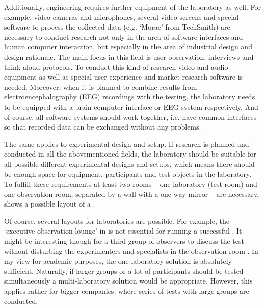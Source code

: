 \documentclass[output=paper]{langsci/langscibook}
\begin{document}
Additionally,  engineering requires further equipment of the laboratory as well. For example, video cameras and microphones, several video screens and special  software to process the collected data (e.g. `Morae' from TechSmith) are necessary to conduct research not only in the area of software interfaces and human computer interaction, but especially in the area of industrial design and design rationale. The main focus in this field is user observation, interviews and think aloud protocols. To conduct this kind of research video and audio equipment as well as special user experience and market research software is needed. Moreover, when it is planned to combine results from electroencephalography (EEG) recordings with the  testing, the laboratory needs to be equipped with a brain computer interface or EEG system respectively. And of course, all software systems should work together, i.e. have common interfaces so that recorded data can be exchanged without any problems.



The same applies to experimental design and setup. If research is planned and conducted in all the abovementioned fields, the laboratory should be suitable for all possible different experimental designs and setups, which means there should be enough space for equipment, participants and test objects in the laboratory. To fulfill these requirements at least two rooms -- one laboratory (test room) and one observation room, separated by a wall with a one way mirror -- are necessary.  shows a possible layout of a .


\newpage 
Of course, several layouts for  laboratories are possible. For example, the `executive observation lounge' in  is not essential for running a successful . It might be interesting though for a third group of observers to discuss the test without disturbing the experimenters and  specialists in the observation room \citep[cf.][203ff.]{nielsen1993}. In my view for academic purposes, the one laboratory solution is absolutely sufficient. Naturally, if larger groups or a lot of participants should be tested simultaneously a multi-laboratory solution would be appropriate. However, this applies rather for bigger companies, where series of tests with large groups are conducted.
\end{document}
